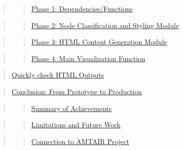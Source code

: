 \documentclass[
  11pt,
  letterpaper,
]{book}
\begin{document}
\begin{quote}
\begin{quote}
\hyperref[scrollTo=LSeSAPvtgIgU]{Phase 1: Dependencies/Functions}
\end{quote}
\end{quote}

\begin{quote}
\begin{quote}
\hyperref[scrollTo=byAExfek5yFU]{Phase 2: Node Classification and
Styling Module}
\end{quote}
\end{quote}

\begin{quote}
\begin{quote}
\hyperref[scrollTo=gnS3jFGU52OZ]{Phase 3: HTML Content Generation
Module}
\end{quote}
\end{quote}

\begin{quote}
\begin{quote}
\hyperref[scrollTo=d2uyG0Pi571f]{Phase 4: Main Visualization Function}
\end{quote}
\end{quote}

\begin{quote}
\hyperref[scrollTo=bFtxTKmLElSF]{Quickly check HTML Outputs}
\end{quote}

\begin{quote}
\hyperref[scrollTo=oatKYlKrOSiN]{Conclusion: From Prototype to
Production}
\end{quote}

\begin{quote}
\begin{quote}
\hyperref[scrollTo=oatKYlKrOSiN]{Summary of Achievements}
\end{quote}
\end{quote}

\begin{quote}
\begin{quote}
\hyperref[scrollTo=oatKYlKrOSiN]{Limitations and Future Work}
\end{quote}
\end{quote}

\begin{quote}
\begin{quote}
\hyperref[scrollTo=oatKYlKrOSiN]{Connection to AMTAIR Project}
\end{quote}
\end{quote}
\end{document}
